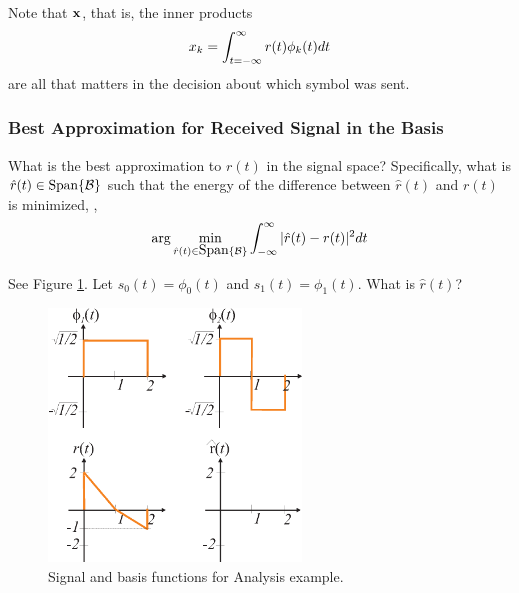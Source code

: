 Note that $\mathbf{x}$, that is, the inner products 
\[
 x_k = {\int_{t = -\infty}^{\infty}  r(t)\phi_k(t) d{t} }
\]
are all that matters in the decision about which symbol was sent.  



\subsubsection{Best Approximation for Received Signal in the Basis}

What is the best approximation to $r(t)$ in the
signal space?  Specifically, what is $\hat{r}(t) \in \mbox{Span} \{ \mathcal{B} \}$ such
that the energy of the difference between $\hat{r}(t)$ and $r(t)$ is
minimized, \ie,
\begin{equation} \label{E:ProjectionError}
  \arg \min_{\hat{r}(t) \in \mbox{Span} \{ \mathcal{B} \}} \int_{-\infty}^\infty | \hat{r}(t) - r(t) |^2 dt
\end{equation}


  See Figure
\ref{F:SignalSpaceAnalysisExample}.   Let $s_0(t) = \phi_0(t)$ and 
$s_1(t) = \phi_1(t)$. What is $\hat{r}(t)$?

\begin{figure}[htbp]
  \centerline{\includegraphics[width=0.6\textwidth]{../images/SigSpace-Analysis-EgProblem.eps}}
  \caption{Signal and basis functions for Analysis example.}
  \label{F:SignalSpaceAnalysisExample}
\end{figure}

